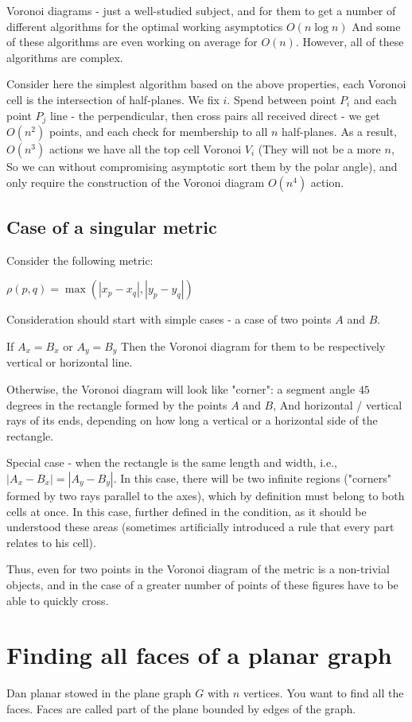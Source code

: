 Voronoi diagrams - just a well-studied subject, and for them to get a number of different algorithms for the optimal working asymptotics $O (n \log n)$ And some of these algorithms are even working on average for $O (n)$. However, all of these algorithms are complex.

Consider here the simplest algorithm based on the above properties, each Voronoi cell is the intersection of half-planes. We fix $i$. Spend between point $P_i$ and each point $P_j$ line - the perpendicular, then cross pairs all received direct - we get $O (n ^ 2)$ points, and each check for membership to all $n$ half-planes. As a result, $O (n ^ 3)$ actions we have all the top cell Voronoi $V_i$ (They will not be a more $n$, So we can without compromising asymptotic sort them by the polar angle), and only require the construction of the Voronoi diagram $O (n ^ 4)$ action.

\subsection{ Case of a singular metric }

Consider the following metric:

$\rho (p, q) = \max (| x_p-x_q |, | y_p-y_q |)$

Consideration should start with simple cases - a case of two points $A$ and $B$.

If $A_x = B_x$ or $A_y = B_y$ Then the Voronoi diagram for them to be respectively vertical or horizontal line.

Otherwise, the Voronoi diagram will look like "corner": a segment angle $45$ degrees in the rectangle formed by the points $A$ and $B$, And horizontal / vertical rays of its ends, depending on how long a vertical or a horizontal side of the rectangle.

Special case - when the rectangle is the same length and width, i.e., $| A_x-B_x | = | A_y-B_y |$. In this case, there will be two infinite regions ("corners" formed by two rays parallel to the axes), which by definition must belong to both cells at once. In this case, further defined in the condition, as it should be understood these areas (sometimes artificially introduced a rule that every part relates to his cell).

Thus, even for two points in the Voronoi diagram of the metric is a non-trivial objects, and in the case of a greater number of points of these figures have to be able to quickly cross.

\section{ Finding all faces of a planar graph }
Dan planar stowed in the plane graph $G$ with $n$ vertices. You want to find all the faces. Faces are called part of the plane bounded by edges of the graph.

